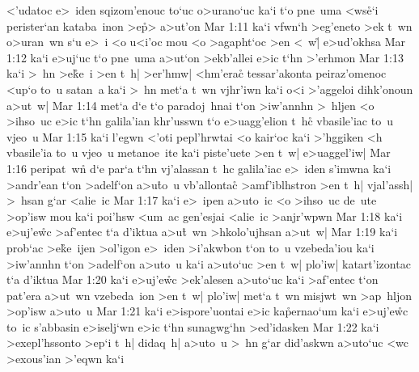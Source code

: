 <'udatoc
e>~iden
sqizom'enouc
to`uc
o>urano`uc
ka`i
t`o
pne~uma
<ws\r{e}`i
perister`an
kataba~inon
>e\r{p}>
a>ut'on\bibvsend
\vs Mar 1:11
ka`i
vfwn`h
>eg'eneto
>ek
t~wn
o>uran~wn
s`u
e>~i
<o
u<i'oc
mou
<o
>agapht`oc
>en
<~w|\r{}
e>ud'okhsa\bibvsend
\vs Mar 1:12
ka`i
e>uj`uc
t`o
pne~uma
a>ut`on
>ekb'allei
e>ic
t`hn
>'erhmon\bibvsend
\vs Mar 1:13
ka`i
>~hn
>e\r{k}e~i
>en
t~h|
>er'hmw|
<hm'erac\r{}
tessar'akonta
peiraz'omenoc
<up`o
to~u
satan~a
ka`i
>~hn
met`a
t~wn
vjhr'iwn
ka`i
o<i
>'aggeloi
dihk'onoun
a>ut~w|\bibvsend
\vs Mar 1:14
met`a
d`e
t`o
paradoj~hnai
t`on
>iw'annhn
>~hljen
<o
>ihso~uc
e>ic
t`hn
galila'ian
khr'usswn
t`o
e>uagg'elion
t~hc\r{}
vbasile'iac
to~u
vjeo~u\bibvsend
\vs Mar 1:15
ka`i
l'egwn
<'oti
pepl'hrwtai
<o
kair`oc
ka`i
>'hggiken
<h
vbasile'ia
to~u
vjeo~u
metanoe~ite
ka`i
piste'uete
>en
t~w|
e>uaggel'iw|\bibvsend
\vs Mar 1:16
peripat~wn\r{}
d`e
par`a
t`hn
vj'alassan
t~hc
galila'iac
e>~iden
s'imwna
ka`i
>andr'ean
t`on
>adelf`on
a>u\r{t}o~u
vb'allontac\r{}
>amf'iblhstron
>en
t~h|
vjal'assh|
>~hsan
g`ar
<alie~ic\bibvsend
\vs Mar 1:17
ka`i
e>~ipen
a>uto~ic
<o
>ihso~uc
de~ute
>op'isw
mou
ka`i
poi'hsw
<um~ac
gen'esjai
<alie~ic
>anjr'wpwn\bibvsend
\vs Mar 1:18
ka`i
e>uj'e\r{w}c
>af'entec
t`a
d'iktua
a>u\r{t}~wn
>hkolo'ujhsan
a>ut~w|\bibvsend
\vs Mar 1:19
ka`i
prob`ac
>e\r{k}e~ijen
>ol'igon
e>~iden
>i'akwbon
t`on
to~u
vzebeda'iou
ka`i
>iw'annhn
t`on
>adelf`on
a>uto~u
ka`i
a>uto`uc
>en
t~w|
plo'iw|
katart'izontac
t`a
d'iktua\bibvsend
\vs Mar 1:20
ka`i
e>uj'e\r{w}c
>ek'alesen
a>uto`uc
ka`i
>af'entec
t`on
pat'era
a>ut~wn
vzebeda~ion
>en
t~w|
plo'iw|
met`a
t~wn
misjwt~wn
>ap~hljon
>op'isw
a>uto~u\bibvsend
\vs Mar 1:21
ka`i
e>ispore'uontai
e>ic
ka\r{p}ernao`um
ka`i
e>uj'e\r{w}c
to~ic
s'abbasin
e>iselj`wn
e>ic
t`hn
sunagwg`hn
>ed'idasken\bibvsend
\vs Mar 1:22
ka`i
>exepl'hssonto
>ep`i
t~h|
didaq~h|
a>uto~u
>~hn
g`ar
did'askwn
a>uto`uc
<wc
>exous'ian
>'eqwn
ka`i
